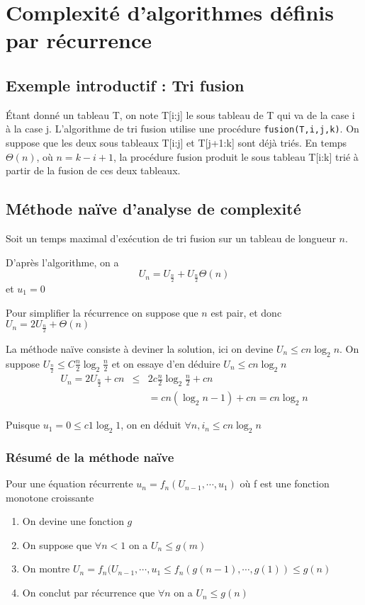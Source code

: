 \chapter{Complexité d'algorithmes définis par récurrence}
	\section{Exemple introductif : Tri fusion}
\'Etant donné un tableau T, on note T[i:j] le sous tableau de T qui va de la case i à la case j. L'algorithme de tri fusion utilise une procédure
\texttt{fusion(T,i,j,k)}. On suppose que les deux sous tableaux T[i:j] et T[j+1:k] sont déjà triés. En temps $\Theta(n)$, où $n=k-i+1$, la procédure
fusion produit le sous tableau T[i:k] trié à partir de la fusion de ces deux tableaux.


	\section{Méthode naïve d'analyse de complexité}
	Soit un temps maximal d'exécution de tri fusion sur un tableau de longueur $n$.

	D'après l'algorithme, on a $$U_n = U_{\frac{n}{2}} + U_{\frac{n}{2}} \Theta(n)$$
	et $u_1 = 0$

	Pour simplifier la récurrence on suppose que $n$ est pair, et donc $U_n = 2U_{\frac{n}{2}} + \Theta(n)$

	La méthode naïve consiste à deviner la solution, ici on devine $U_n \leq c n \log_2 n$. On suppose $U_{\frac{n}{2}} \leq C \frac{n}{2} \log_2
	\frac{n}{2}$ et on essaye d'en déduire $U_n \leq c n \log_2 n$
	\begin{eqnarray*}
		U_n = 2U_{\frac{n}{2}} + cn &\leq& 2c \frac{n}{2} \log_2 \frac{n}{2} + cn \\&&= cn(\log_2 n -1) + cn = cn\log_2 n
	\end{eqnarray*}

	Puisque $u_1=0 \leq c 1 \log_2 1$, on en déduit $\forall n, i_n \leq cn \log_2 n$

	\subsection{Résumé de la méthode naïve}
	Pour une équation récurrente $u_n = f_n(U_{n-1}, \cdots, u_1)$ où f est une fonction monotone croissante
	\begin{enumerate}
		\item On devine une fonction $g$
		\item On suppose que $\forall n < 1$ on a $U_n \leq g(m)$
		\item On montre $U_n = f_n(U_{n-1},\cdots,u_1 \leq f_n(g(n-1), \cdots, g(1)) \leq g(n)$
		\item On conclut par récurrence que $\forall n$ on a $U_n \leq g(n)$
	\end{enumerate}
